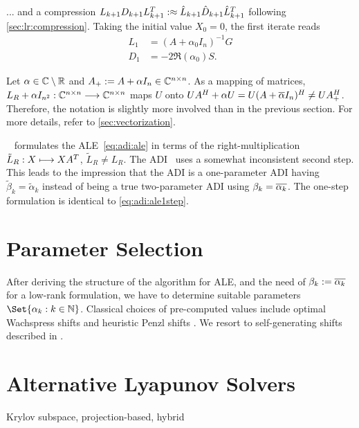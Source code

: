 ...
and a compression $L_{k+1} D_{k+1} L_{k+1}^T :\approx \hat L_{k+1} \hat D_{k+1} \hat L_{k+1}^T$
following \autoref{sec:lr:compression}.
Taking the initial value $X_0 = 0$, the first iterate reads
\begin{align*}
  L_1 &= (A+\alpha_0 I_n)^{-1} G \\
  D_1 &= -2\Re(\alpha_0) S
  .
\end{align*}

\begin{remark}
  Let $\alpha\in\mathbb{C}\setminus\mathbb{R}$ and $A_+ := A+\alpha I_n \in\mathbb{C}^{n\times n}$.
  As a mapping of matrices,
  $L_R + \alpha I_{n^2} : \mathbb{C}^{n\times n} \longrightarrow \mathbb{C}^{n\times n}$ maps $U$ onto
  $
    U A^\HT + \alpha U =
    U(A+\conj{\alpha} I_n)^\HT \neq
    U A_+^\HT
  $.
  Therefore, the notation is slightly more involved than in the previous section.
  For more details, refer to \autoref{sec:vectorization}.
\end{remark}

\begin{remark}
  \citeauthor{Lang2017}~\cite{Lang2017} formulates the \ac{ALE}~\eqref{eq:adi:ale} in terms of the
  right-multiplication $\tilde L_R :X \longmapsto XA^T$, $\tilde L_R \neq L_R$.
  The ADI~\cite[Equation~(2.23)]{Lang2017} uses a somewhat inconsistent second step.
  This leads to the impression that the ADI is a one-parameter ADI having $\tilde\beta_k = \tilde\alpha_k$
  instead of being a true two-parameter ADI using $\beta_k = \conj{\alpha_k}$.
  The one-step formulation \cite[Equation~(2.24)]{Lang2017} is identical to \eqref{eq:adi:ale1step}.
\end{remark}


\section{Parameter Selection}
\label{sec:adi:parameters}

After deriving the structure of the algorithm for \ac{ALE},
and the need of $\beta_k := \conj{\alpha_k}$ for a low-rank formulation,
we have to determine suitable parameters $\Set{\alpha_k : k\in\N}$.
Classical choices of pre-computed values include
optimal Wachspress shifts \cite{Wachspress1992,Wachspress2013} and
heuristic Penzl shifts \cite{Penzl1999}.
We resort to self-generating shifts described in \cite[Section~5.3]{Kuerschner2016}.

\section{Alternative Lyapunov Solvers}
Krylov subspace,
projection-based,
hybrid
